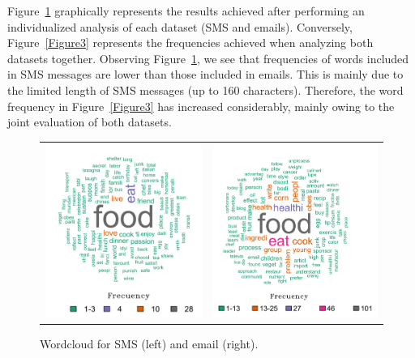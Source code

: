 Figure~\ref{Figure2} graphically represents the results achieved after performing an individualized analysis of each dataset (SMS and emails). Conversely, Figure~\ref{Figure3} represents the frequencies achieved when analyzing both datasets together. Observing Figure~\ref{Figure2}, we see that frequencies of words included in SMS messages are lower than those included in emails. This is mainly due to the limited length of SMS messages (up to 160 characters). Therefore, the word frequency in Figure~\ref{Figure3} has increased considerably, mainly owing to the joint evaluation of both datasets. 
\begin{figure}[H]
	\centering
	\begin{tabularx}{\textwidth}{XX}
		\includegraphics[width=.5\textwidth, height=.5\textwidth, keepaspectratio]{Figures/Figure2a.pdf}&
		\includegraphics[width=.5\textwidth, height=.5\textwidth, keepaspectratio]{Figures/Figure2b.pdf}\\
	\end{tabularx}
	\caption{Wordcloud for SMS (left) and email (right).}
	\label{Figure2}
\end{figure}

